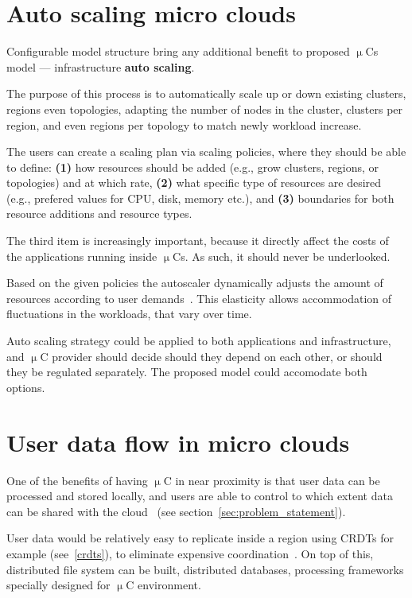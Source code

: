 \section{Auto scaling micro clouds}\label{sec:Auto Scaling}
%
Configurable model structure bring any additional benefit to proposed $\upmu$Cs model --- infrastructure \textbf{auto scaling}. 

The purpose of this process is to automatically scale up or down existing clusters, regions even topologies, adapting the number of nodes in the cluster, clusters per region, and even regions per topology to match newly workload increase.

The users can create a scaling plan via scaling policies, where they should be able to define: \textbf{(1)} how resources should be added (e.g., grow clusters, regions, or topologies) and at which rate, \textbf{(2)} what specific type of resources are desired (e.g., prefered values for CPU, disk, memory etc.), and \textbf{(3)} boundaries for both resource additions and resource types.

The third item is increasingly important, because it directly affect the costs of the applications running inside $\upmu$Cs. As such, it should never be underlooked.

Based on the given policies the autoscaler dynamically adjusts the amount of resources according to user demands~\cite{TamiruTEP20}. This elasticity allows accommodation of fluctuations in the workloads, that vary over time.

Auto scaling strategy could be applied to both applications and infrastructure, and $\upmu$C provider should decide should they depend on each other, or should they be regulated separately. The proposed model could accomodate both options.
%
%
\section{User data flow in micro clouds}\label{sec:user_data}
%
One of the benefits of having $\upmu$C in near proximity is that user data can be processed and stored locally, and users are able to control to which extent data can be shared with the cloud~\cite{SatyanarayananK19} (see section~\ref{sec:problem_statement}). 

User data would be relatively easy to replicate inside a region using CRDTs for example (see~\ref{crdts}), to eliminate expensive coordination~\cite{inproceedingsSimic2}. On top of this, distributed file system can be built, distributed databases, processing frameworks specially designed for $\upmu$C environment.

